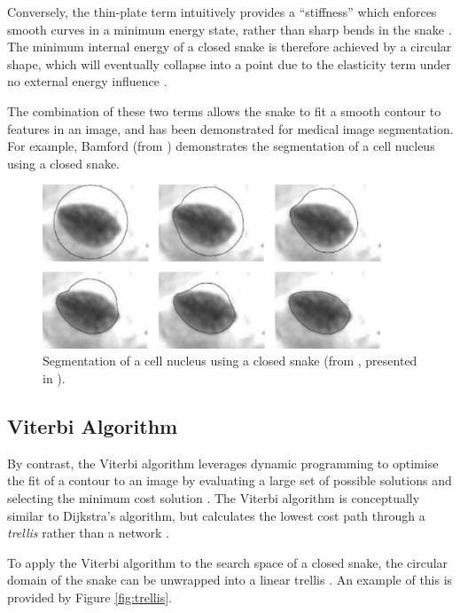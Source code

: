 Conversely, the thin-plate term intuitively provides a ``stiffness'' which enforces smooth curves in a minimum energy state, rather than sharp bends in the snake \cite{biswas_2007}. The minimum internal energy of a closed snake is therefore achieved by a circular shape, which will eventually collapse into a point due to the elasticity term under no external energy influence \cite{biswas_2007}.

The combination of these two terms allows the snake to fit a smooth contour to features in an image, and has been demonstrated for medical image segmentation. For example, Bamford \cite{bamford_1999} (from \cite{biswas_2007}) demonstrates the segmentation of a cell nucleus using a closed snake.

\begin{figure}[ht]
  \centering
  \includegraphics[width=0.9\textwidth]{images/q1_snakes.png}
  \caption{Segmentation of a cell nucleus using a closed snake (from \cite{bamford_1999}, presented in \cite{biswas_2007}).}
\end{figure}

\subsection{Viterbi Algorithm}

By contrast, the Viterbi algorithm leverages dynamic programming to optimise the fit of a contour to an image by evaluating a large set of possible solutions and selecting the minimum cost solution \cite{biswas_2007}. The Viterbi algorithm is conceptually similar to Dijkstra's algorithm, but calculates the lowest cost path through a \textit{trellis} rather than a network \cite{biswas_2007}.

To apply the Viterbi algorithm to the search space of a closed snake, the circular domain of the snake can be unwrapped into a linear trellis \cite{biswas_2007}. An example of this is provided by Figure \ref{fig:trellis}.

